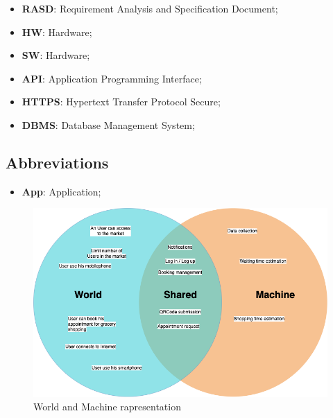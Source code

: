 \begin{itemize}
\subsection{Acronyms}
\item \textbf{RASD}: Requirement Analysis and Specification Document;
\item \textbf{HW}: Hardware;
\item \textbf{SW}: Hardware;
\item \textbf{API}: Application Programming Interface;
\item \textbf{HTTPS}: Hypertext Transfer Protocol Secure;
\item \textbf{DBMS}: Database Management System;

\end{itemize}


\subsection{Abbreviations}
\begin{itemize}
\item \textbf{App}: Application;

\end{itemize}


\begin{figure}[H]
  \caption{World and Machine rapresentation}
  \label{fig:Reservation}
  \centering
  \includegraphics[scale = 0.38]{diagrams/VENN.png}
\end{figure}

